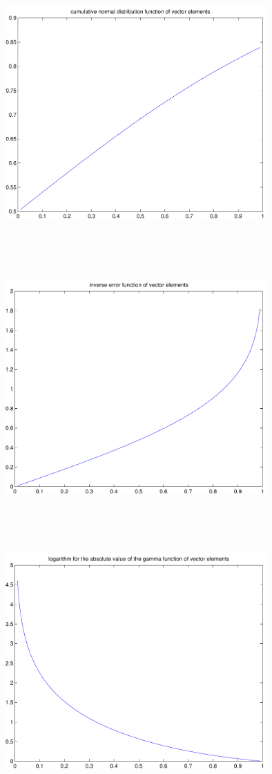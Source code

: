 \documentclass[9pt]{article}
\theoremstyle{plain}
\theoremstyle{definition}
\theoremstyle{remark}
\numberwithin{equation}{section}
\begin{document}
\includegraphics[width=10.0cm,height=10.0cm]{klVSLCdfNorm.pdf}

\includegraphics[width=10.0cm,height=10.0cm]{klVSLErfInv.pdf}

\includegraphics[width=10.0cm,height=10.0cm]{klVSLLGamma.pdf}
\end{document}

